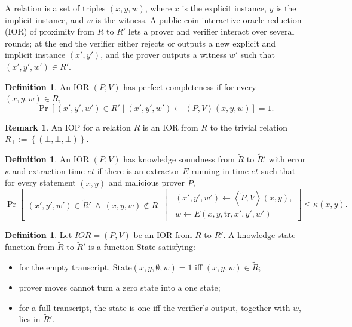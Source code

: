 \documentclass[11pt]{article}
\theoremstyle{plain}
\theoremstyle{definition}
\newtheorem{definition}[theorem]{Definition}
\newtheorem{remark}[theorem]{Remark}
\newcommand{\set}[1]{\left\{#1\right\}}
\newcommand{\angles}[1]{\left\langle #1\right\rangle}
\DeclareMathOperator*{\Prb}{Pr}
\begin{document}
A relation is a set of triples $(x,y,w)$, where $x$ is the explicit instance, $y$ is the implicit instance, and $w$ is the witness. A public-coin interactive oracle reduction (IOR) of proximity from $R$ to $R'$ lets a prover and verifier interact over several rounds; at the end the verifier either rejects or outputs a new explicit and implicit instance $(x',y')$, and the prover outputs a witness $w'$ such that $(x',y',w')\in R'$.

\begin{definition}
An IOR $(P,V)$ has perfect completeness if for every $(x,y,w)\in R$,
\[
\Prb[(x',y',w')\in R'\mid (x',y',w')\leftarrow\angles{P,V}(x,y,w)]=1.
\]
\end{definition}

\begin{remark}
An IOP for a relation $R$ is an IOR from $R$ to the trivial relation $R_\bot:=\set{(\bot,\bot,\bot)}$.
\end{remark}

\begin{definition}
An IOR $(P,V)$ has knowledge soundness from $\widetilde R$ to $\widetilde R'$ with error $\kappa$ and extraction time $et$ if there is an extractor $E$ running in time $et$ such that for every statement $(x,y)$ and malicious prover $\widetilde P$,
\[
\Prb\left[
\begin{array}{c}
(x',y',w')\in\widetilde R'\ \wedge\ (x,y,w)\notin\widetilde R
\end{array}
\ \middle|\
\begin{array}{c}
(x',y',w')\leftarrow\angles{\widetilde P,V}(x,y),\\
w\leftarrow E(x,y,\mathrm{tr},x',y',w')
\end{array}
\right]
\le \kappa(x,y).
\]
\end{definition}

\begin{definition}
Let $IOR=(P,V)$ be an IOR from $R$ to $R'$. A knowledge state function from $\widetilde R$ to $\widetilde R'$ is a function $\mathrm{State}$ satisfying:
\begin{itemize}
  \item for the empty transcript, $\mathrm{State}(x,y,\emptyset,w)=1$ iff $(x,y,w)\in\widetilde R$;
  \item prover moves cannot turn a zero state into a one state;
  \item for a full transcript, the state is one iff the verifier's output, together with $w$, lies in $\widetilde R'$.
\end{itemize}
\end{definition}
\end{document}
